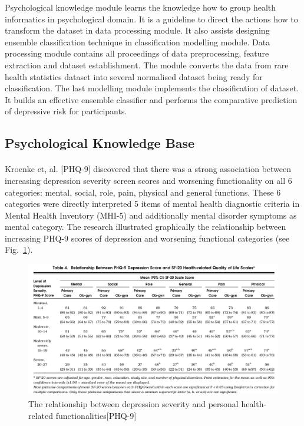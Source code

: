 \documentclass[runningheads]{llncs}
\begin{document}
%
Psychological knowledge module learns the knowledge how to group health informatics in psychological domain. It is a guideline to direct the actions how to transform the dataset in data processing module. It also assists designing ensemble classification technique in classification modelling module. Data processing module contains all proceedings of data preprocessing, feature extraction and dataset establishment. The module converts the data from rare health statistics dataset into several normalised dataset being ready for classification. The last modelling module implements the classification of dataset. It builds an effective ensemble classifier and performs the comparative prediction of depressive risk for participants. 
%
%
\subsection{Psychological Knowledge Base}
%
\paragraph{}
Kroenke et, al. [PHQ-9] discovered that there was a strong association between increasing depression severity screen scores and worsening functionality on all 6 categories: mental, social, role, pain, physical and general functions. These 6 categories were directly interpreted 5 items of mental health diagnostic criteria in Mental Health Inventory (MHI-5) and additionally mental disorder symptoms as mental category. The research illustrated graphically the relationship between increasing PHQ-9 scores of depression and worsening functional categories (see Fig.~\ref{fig2}). 
\begin{figure}[h]
\includegraphics[width=1\textwidth]{phq-9.png}
\caption{The relationship between depression severity and personal health-related functionalities[PHQ-9]} \label{fig2}
\end{figure}
\end{document}
